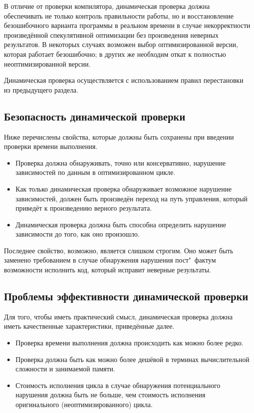 В отличие от проверки компилятора, динамическая проверка должна обеспечивать не только контроль правильности работы, но и восстановление безошибочного варианта программы в реальном времени в случае некорректности произведённой спекулятивной оптимизации без произведения неверных результатов. В некоторых случаях возможен выбор оптимизированной версии, которая работает безошибочно; в других же необходим откат к полностью неоптимизированной версии.

Динамическая проверка осуществляется с использованием правил перестановки из предыдущего раздела.

\subsection{Безопасность динамической проверки}

Ниже перечислены свойства, которые должны быть сохранены при введении проверки времени выполнения.

\begin{itemize}
	\item Проверка должна обнаруживать, точно или консервативно, нарушение зависимостей по данным в оптимизированном цикле.
	\item Как только динамическая проверка обнаруживает возможное нарушение зависимостей, должен быть произведён переход на путь управления, который приведёт к произведению верного результата.
	\item Динамическая проверка должна быть способна определить нарушение зависимости до того, как оно произошло.
\end{itemize}

Последнее свойство, возможно, является слишком строгим. Оно может быть заменено требованием в случае обнаружения нарушения пост"~фактум возможности исполнить код, который исправит неверные результаты.

\subsection{Проблемы эффективности динамической проверки}

Для того, чтобы иметь практический смысл, динамическая проверка должна иметь качественные характеристики, приведённые далее.

\begin{itemize}
	\item Проверка времени выполнения должна происходить как можно более редко.
	\item Проверка должна быть как можно более дешёвой в терминах вычислительной сложности и занимаемой памяти.
	\item Стоимость исполнения цикла в случае обнаружения потенциального нарушения должна быть не больше, чем стоимость исполнения оригинального (неоптимизированного) цикла.
\end{itemize}

